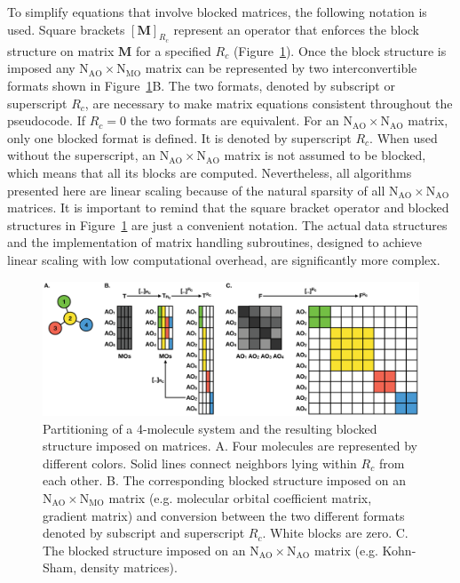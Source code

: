 \documentclass[aip,jcp,reprint,amsmath,amssymb]{revtex4-1}
\begin{document}
To simplify equations that involve blocked matrices, the following notation is used. Square brackets $[\mathbf{M}]_{R_c}$ represent an operator that enforces the block structure on matrix $\mathbf{M}$ for a specified $R_c$ (Figure~\ref{fig:blocks}). Once the block structure is imposed any $\text{N}_{\text{AO}} \times \text{N}_{\text{MO}}$ matrix can be represented by two interconvertible formats shown in Figure~\ref{fig:blocks}B. The two formats, denoted by subscript or superscript $R_c$, are necessary to make matrix equations consistent throughout the pseudocode. If $R_c = 0$ the two formats are equivalent. For an $\text{N}_{\text{AO}} \times \text{N}_{\text{AO}}$ matrix, only one blocked format is defined. It is denoted by superscript $R_c$. When used without the superscript, an $\text{N}_{\text{AO}} \times \text{N}_{\text{AO}}$ matrix is not assumed to be blocked, which means that all its blocks are computed. Nevertheless, all algorithms presented here are linear scaling because of the natural sparsity of all $\text{N}_{\text{AO}} \times \text{N}_{\text{AO}}$ matrices. It is important to remind that the square bracket operator and blocked structures in Figure~\ref{fig:blocks} are just a convenient notation. The actual data structures and the implementation of matrix handling subroutines, designed to achieve linear scaling with low computational overhead, are significantly more complex. 

\begin{figure}
\includegraphics[trim={0cm 0cm 0.1cm 0.1cm},clip,width=17.5cm]{ALMO.eps}
\caption{\label{fig:blocks} Partitioning of a 4-molecule system and the resulting blocked structure imposed on matrices. A. Four molecules are represented by different colors. Solid lines connect neighbors lying within $R_c$ from each other. B. The corresponding blocked structure imposed on an $\text{N}_{\text{AO}} \times \text{N}_{\text{MO}}$ matrix (e.g. molecular orbital coefficient matrix, gradient matrix) and conversion between the two different formats denoted by subscript and superscript $R_c$. White blocks are zero. C. The blocked structure imposed on an $\text{N}_{\text{AO}}\times\text{N}_{\text{AO}}$ matrix (e.g. Kohn-Sham, density matrices).}
\end{figure}
\end{document}
